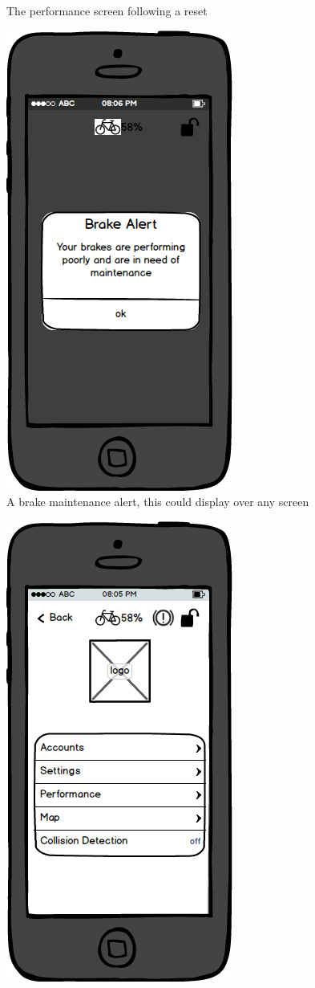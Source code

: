 \documentclass[a4paper]{report}
\begin{document}
{\begin{figure}
\caption{The performance screen following a reset}
\end{figure}
\clearpage
\begin{figure}
\centering
\includegraphics[scale=0.9]{figures/prototype_2/brake_maintenance}
\caption{A brake maintenance alert, this could display over any screen}
\end{figure}
\clearpage
\begin{figure}
\centering
\includegraphics[scale=0.9]{figures/prototype_2/main_brake_warn}

\end{figure}}
\end{document}
